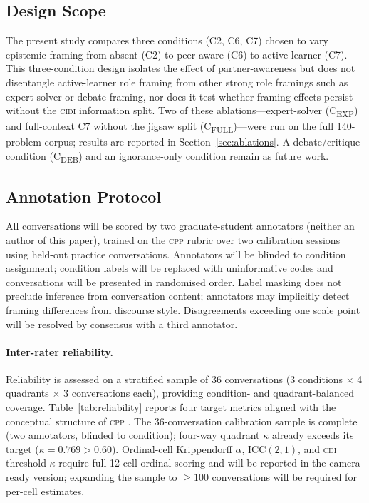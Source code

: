 \documentclass{article}
\newcommand{\CDI}{\textsc{cdi}}
\newcommand{\CPP}{\textsc{cpp}}
\newcommand{\CIDI}{\textsc{cidi}}
\begin{document}
\subsection{Design Scope}
\label{sec:scope}

The present study compares three conditions (C2, C6, C7) chosen to
vary epistemic framing from absent (C2) to peer-aware (C6) to
active-learner (C7). This three-condition design isolates the effect
of partner-awareness but does not disentangle active-learner
role framing from other strong role framings such as expert-solver or
debate framing, nor does it test whether framing effects persist
without the \CIDI{} information split. Two of these ablations---expert-solver
(C\textsubscript{EXP}) and full-context C7 without the jigsaw split
(C\textsubscript{FULL})---were run on the full 140-problem corpus;
results are reported in Section~\ref{sec:ablations}. A debate/critique
condition (C\textsubscript{DEB}) and an ignorance-only condition remain
as future work.

\subsection{Annotation Protocol}
\label{sec:annotation}

All conversations will be scored by two graduate-student annotators
(neither an author of this paper), trained on the \CPP{} rubric over
two calibration sessions using held-out practice conversations.
Annotators will be blinded to condition assignment; condition labels
will be replaced with uninformative codes and conversations will be
presented in randomised order.
Label masking does not preclude inference from conversation content;
annotators may implicitly detect framing differences from discourse style.
Disagreements exceeding one scale point will be resolved by consensus
with a third annotator.

\paragraph{Inter-rater reliability.}
Reliability is assessed on a stratified sample of 36 conversations
(3 conditions $\times$ 4 quadrants $\times$ 3 conversations each),
providing condition- and quadrant-balanced coverage.
Table~\ref{tab:reliability} reports four target metrics aligned
with the conceptual structure of \CPP{} \citep{hayes2007answering}.
The 36-conversation calibration sample is complete (two annotators,
blinded to condition); four-way quadrant $\kappa$ already exceeds its
target ($\kappa = 0.769 > 0.60$). Ordinal-cell Krippendorff $\alpha$,
ICC$(2,1)$, and \CDI{} threshold $\kappa$ require full 12-cell ordinal
scoring and will be reported in the camera-ready version; expanding the
sample to $\geq 100$ conversations will be required for per-cell estimates.
\end{document}
